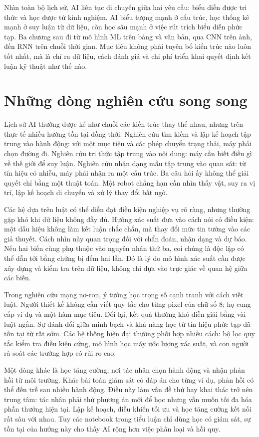 \documentclass[12pt,a4paper]{report}
\begin{document}
Nhìn toàn bộ lịch sử, AI liên tục di chuyển giữa hai yêu cầu: biểu diễn được tri thức và học được từ kinh nghiệm. AI biểu tượng mạnh ở cấu trúc, học thống kê mạnh ở suy luận từ dữ liệu, còn học sâu mạnh ở việc rút trích biểu diễn phức tạp. Ba chương sau đi từ mô hình ML trên bảng và văn bản, qua CNN trên ảnh, đến RNN trên chuỗi thời gian. Mục tiêu không phải tuyên bố kiến trúc nào luôn tốt nhất, mà là chỉ ra dữ liệu, cách đánh giá và chi phí triển khai quyết định kết luận kỹ thuật như thế nào.

\section{Những dòng nghiên cứu song song}
Lịch sử AI thường được kể như chuỗi các kiến trúc thay thế nhau, nhưng trên thực tế nhiều hướng tồn tại đồng thời. Nghiên cứu tìm kiếm và lập kế hoạch tập trung vào hành động: với một mục tiêu và các phép chuyển trạng thái, máy phải chọn đường đi. Nghiên cứu tri thức tập trung vào nội dung: máy cần biết điều gì về thế giới để suy luận. Nghiên cứu nhận dạng mẫu tập trung vào quan sát: từ tín hiệu có nhiễu, máy phải nhận ra một cấu trúc. Ba câu hỏi ấy không thể giải quyết chỉ bằng một thuật toán. Một robot chẳng hạn cần nhìn thấy vật, suy ra vị trí, lập kế hoạch di chuyển và xử lý thay đổi bất ngờ.

Các hệ dựa trên luật có thể diễn đạt điều kiện nghiệp vụ rõ ràng, nhưng thường gặp khó khi dữ liệu không đầy đủ. Hướng xác suất đưa vào cách nói có điều kiện: một dấu hiệu không làm kết luận chắc chắn, mà thay đổi mức tin tưởng vào các giả thuyết. Cách nhìn này quan trọng đối với chẩn đoán, nhận dạng và dự báo. Nếu hai biến cùng phụ thuộc vào nguyên nhân thứ ba, coi chúng là độc lập có thể dẫn tới bằng chứng bị đếm hai lần. Đó là lý do mô hình xác suất cần được xây dựng và kiểm tra trên dữ liệu, không chỉ dựa vào trực giác về quan hệ giữa các biến.

Trong nghiên cứu mạng nơ-ron, ý tưởng học trọng số cạnh tranh với cách viết luật. Người thiết kế không cần viết quy tắc cho từng pixel của chữ số 8; họ cung cấp ví dụ và một hàm mục tiêu. Đổi lại, kết quả thường khó diễn giải bằng vài luật ngắn. Sự đánh đổi giữa minh bạch và khả năng học từ tín hiệu phức tạp đã tồn tại từ rất sớm. Các hệ thống hiện đại thường phối hợp nhiều cách: bộ lọc quy tắc kiểm tra điều kiện cứng, mô hình học máy ước lượng xác suất, và con người rà soát các trường hợp có rủi ro cao.

Một dòng khác là học tăng cường, nơi tác nhân chọn hành động và nhận phản hồi từ môi trường. Khác bài toán giám sát có đáp án cho từng ví dụ, phản hồi có thể đến trễ sau nhiều hành động. Điều này làm vấn đề thử hay khai thác trở nên trung tâm: tác nhân phải thử phương án mới để học nhưng vẫn muốn tối đa hóa phần thưởng hiện tại. Lập kế hoạch, điều khiển tối ưu và học tăng cường kết nối rất sâu với nhau. Tuy các notebook trong tiểu luận chỉ dùng học có giám sát, sự tồn tại của hướng này cho thấy AI rộng hơn việc phân loại và hồi quy.
\end{document}
